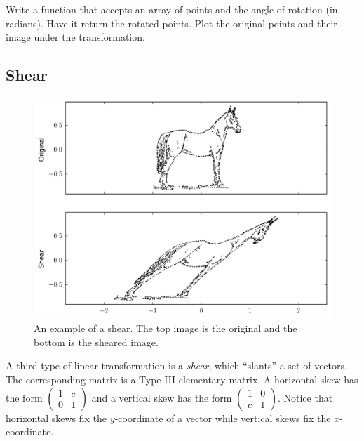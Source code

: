 \begin{problem}
Write a function that accepts an array of points and the angle of rotation (in radians). Have it return the rotated points.
Plot the original points and their image under the transformation.
\end{problem}

\subsection*{Shear}

\begin{figure}
\includegraphics[width=\textwidth]{shear.pdf}
\caption{An example of a shear.
The top image is the original and the bottom is the sheared image.}
\label{basis:shear}
\end{figure}

A third type of linear transformation is a \emph{shear}, which ``slants'' a set of vectors. The corresponding matrix is a Type III elementary matrix. A horizontal skew has the form $\begin{pmatrix}
1 & c \\
0 & 1
\end{pmatrix}$ and a vertical skew has the form $
 \begin{pmatrix}
1 & 0 \\
c & 1
\end{pmatrix}
$. Notice that horizontal skews fix the $y$-coordinate of a vector while vertical skews fix the $x$-coordinate.

